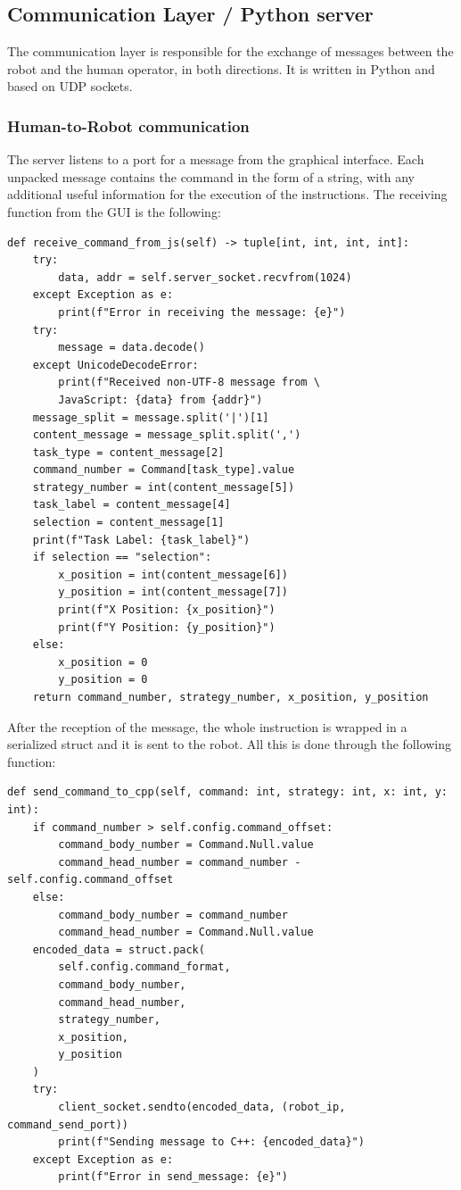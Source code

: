 \documentclass[a4paper, onecolumn, 12pt]{article}
\begin{document}
\subsection{Communication Layer / Python server}

The communication layer is responsible for the exchange of messages between the
robot and the human operator, in both directions. 
It is written in Python and based on UDP sockets. 

\subsubsection{Human-to-Robot communication}
The server listens to a port for a message from the graphical interface. Each unpacked message contains
the command in the form of a string, with any additional useful information for the execution of the instructions.
The receiving function from the GUI is the following:
\begin{verbatim}
def receive_command_from_js(self) -> tuple[int, int, int, int]:
    try:
        data, addr = self.server_socket.recvfrom(1024)
    except Exception as e:
        print(f"Error in receiving the message: {e}")
    try:
        message = data.decode()
    except UnicodeDecodeError:
        print(f"Received non-UTF-8 message from \
        JavaScript: {data} from {addr}")
    message_split = message.split('|')[1]
    content_message = message_split.split(',')
    task_type = content_message[2]
    command_number = Command[task_type].value
    strategy_number = int(content_message[5])
    task_label = content_message[4]
    selection = content_message[1]
    print(f"Task Label: {task_label}")
    if selection == "selection":
        x_position = int(content_message[6])
        y_position = int(content_message[7])
        print(f"X Position: {x_position}")
        print(f"Y Position: {y_position}")
    else:
        x_position = 0
        y_position = 0
    return command_number, strategy_number, x_position, y_position
\end{verbatim}

After the reception of the message, the whole instruction is wrapped in a serialized
struct and it is sent to the robot. All this is done through the following function:


\begin{verbatim}
def send_command_to_cpp(self, command: int, strategy: int, x: int, y: int):
    if command_number > self.config.command_offset:
        command_body_number = Command.Null.value
        command_head_number = command_number - self.config.command_offset
    else:
        command_body_number = command_number
        command_head_number = Command.Null.value
    encoded_data = struct.pack(
        self.config.command_format,
        command_body_number,
        command_head_number,
        strategy_number,
        x_position,
        y_position
    )
    try:
        client_socket.sendto(encoded_data, (robot_ip, command_send_port))
        print(f"Sending message to C++: {encoded_data}")
    except Exception as e:
        print(f"Error in send_message: {e}")
\end{verbatim}
\end{document}
